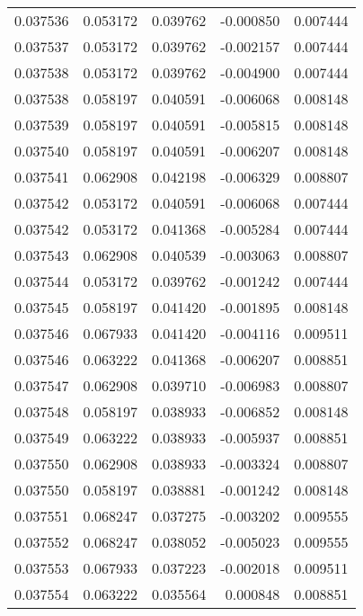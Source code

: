 \begin{tabular}{lrrrr}
0.037536    &  0.053172 &  0.039762 & -0.000850 &             0.007444 \\
0.037537    &  0.053172 &  0.039762 & -0.002157 &             0.007444 \\
0.037538    &  0.053172 &  0.039762 & -0.004900 &             0.007444 \\
0.037538    &  0.058197 &  0.040591 & -0.006068 &             0.008148 \\
0.037539    &  0.058197 &  0.040591 & -0.005815 &             0.008148 \\
0.037540    &  0.058197 &  0.040591 & -0.006207 &             0.008148 \\
0.037541    &  0.062908 &  0.042198 & -0.006329 &             0.008807 \\
0.037542    &  0.053172 &  0.040591 & -0.006068 &             0.007444 \\
0.037542    &  0.053172 &  0.041368 & -0.005284 &             0.007444 \\
0.037543    &  0.062908 &  0.040539 & -0.003063 &             0.008807 \\
0.037544    &  0.053172 &  0.039762 & -0.001242 &             0.007444 \\
0.037545    &  0.058197 &  0.041420 & -0.001895 &             0.008148 \\
0.037546    &  0.067933 &  0.041420 & -0.004116 &             0.009511 \\
0.037546    &  0.063222 &  0.041368 & -0.006207 &             0.008851 \\
0.037547    &  0.062908 &  0.039710 & -0.006983 &             0.008807 \\
0.037548    &  0.058197 &  0.038933 & -0.006852 &             0.008148 \\
0.037549    &  0.063222 &  0.038933 & -0.005937 &             0.008851 \\
0.037550    &  0.062908 &  0.038933 & -0.003324 &             0.008807 \\
0.037550    &  0.058197 &  0.038881 & -0.001242 &             0.008148 \\
0.037551    &  0.068247 &  0.037275 & -0.003202 &             0.009555 \\
0.037552    &  0.068247 &  0.038052 & -0.005023 &             0.009555 \\
0.037553    &  0.067933 &  0.037223 & -0.002018 &             0.009511 \\
0.037554    &  0.063222 &  0.035564 &  0.000848 &             0.008851 \\

\end{tabular}
